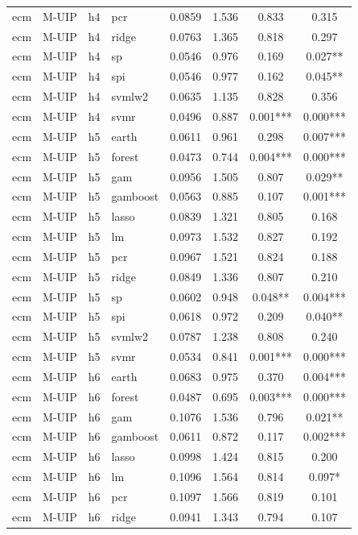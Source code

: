 \begin{ThreePartTable}
\begin{longtable}[t]{llclcccc}
ecm & M-UIP & h4 & pcr & 0.0859 & 1.536 & 0.833 & 0.315\\
ecm & M-UIP & h4 & ridge & 0.0763 & 1.365 & 0.818 & 0.297\\
ecm & M-UIP & h4 & sp & 0.0546 & 0.976 & 0.169 & 0.027**\\
ecm & M-UIP & h4 & spi & 0.0546 & 0.977 & 0.162 & 0.045**\\
ecm & M-UIP & h4 & svmlw2 & 0.0635 & 1.135 & 0.828 & 0.356\\
ecm & M-UIP & h4 & svmr & 0.0496 & 0.887 & 0.001*** & 0.000***\\
\addlinespace
ecm & M-UIP & h5 & earth & 0.0611 & 0.961 & 0.298 & 0.007***\\
ecm & M-UIP & h5 & forest & 0.0473 & 0.744 & 0.004*** & 0.000***\\
ecm & M-UIP & h5 & gam & 0.0956 & 1.505 & 0.807 & 0.029**\\
ecm & M-UIP & h5 & gamboost & 0.0563 & 0.885 & 0.107 & 0.001***\\
ecm & M-UIP & h5 & lasso & 0.0839 & 1.321 & 0.805 & 0.168\\
ecm & M-UIP & h5 & lm & 0.0973 & 1.532 & 0.827 & 0.192\\
ecm & M-UIP & h5 & pcr & 0.0967 & 1.521 & 0.824 & 0.188\\
ecm & M-UIP & h5 & ridge & 0.0849 & 1.336 & 0.807 & 0.210\\
ecm & M-UIP & h5 & sp & 0.0602 & 0.948 & 0.048** & 0.004***\\
ecm & M-UIP & h5 & spi & 0.0618 & 0.972 & 0.209 & 0.040**\\
ecm & M-UIP & h5 & svmlw2 & 0.0787 & 1.238 & 0.808 & 0.240\\
ecm & M-UIP & h5 & svmr & 0.0534 & 0.841 & 0.001*** & 0.000***\\
\addlinespace
ecm & M-UIP & h6 & earth & 0.0683 & 0.975 & 0.370 & 0.004***\\
ecm & M-UIP & h6 & forest & 0.0487 & 0.695 & 0.003*** & 0.000***\\
ecm & M-UIP & h6 & gam & 0.1076 & 1.536 & 0.796 & 0.021**\\
ecm & M-UIP & h6 & gamboost & 0.0611 & 0.872 & 0.117 & 0.002***\\
ecm & M-UIP & h6 & lasso & 0.0998 & 1.424 & 0.815 & 0.200\\
ecm & M-UIP & h6 & lm & 0.1096 & 1.564 & 0.814 & 0.097*\\
ecm & M-UIP & h6 & pcr & 0.1097 & 1.566 & 0.819 & 0.101\\
ecm & M-UIP & h6 & ridge & 0.0941 & 1.343 & 0.794 & 0.107\\

\end{longtable}
\end{ThreePartTable}
